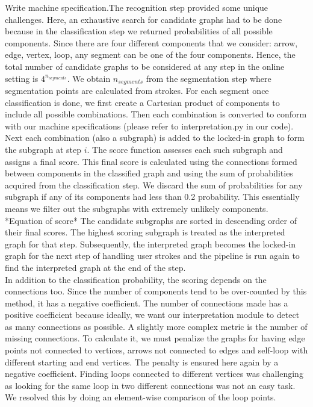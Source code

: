 Write machine specification.The recognition step provided some unique challenges. Here, an exhaustive search for candidate graphs had to be done because in the classification step we returned probabilities of all possible components. Since there are four different components that we consider: arrow, edge, vertex, loop, any segment can be one of the four components. Hence, the total number of candidate graphs to be considered at any step in the online setting is $4^{n_{segments}}$. We obtain $n_{segments}$ from the segmentation step where segmentation points are calculated from strokes. For each segment once classification is done, we first create a Cartesian product of components to include all possible combinations. Then each combination is converted to conform with our machine specifications (please refer to interpretation.py in our code). Next each combination (also a subgraph) is added to the locked-in graph to form the subgraph at step $i$. The score function assesses each such subgraph and assigns a final score. This final score is calculated using the connections formed between components in the classified graph and using the sum of probabilities acquired from the classification step. We discard the sum of probabilities for any subgraph if any of its components had less than 0.2 probability. This essentially means we filter out the subgraphs with extremely unlikely components. *Equation of score* The candidate subgraphs are sorted in descending order of their final scores. The highest scoring subgraph is treated as the interpreted graph for that step. Subsequently, the interpreted graph becomes the locked-in graph for the next step of handling user strokes and the pipeline is run again to find the interpreted graph at the end of the step.\\

In addition to the classification probability, the scoring depends on the connections too. Since the number of components tend to be over-counted by this method, it has a negative coefficient. The number of connections made has a positive coefficient because ideally, we want our interpretation module to detect as many connections as possible. A slightly more complex metric is the number of missing connections. To calculate it, we must penalize the graphs for having edge points not connected to vertices, arrows not connected to edges and self-loop with different starting and end vertices. The penalty is ensured here again by a negative coefficient. Finding loops connected to different vertices was challenging as looking for the same loop in two different connections was not an easy task. We resolved this by doing an element-wise comparison of the loop points.\\


